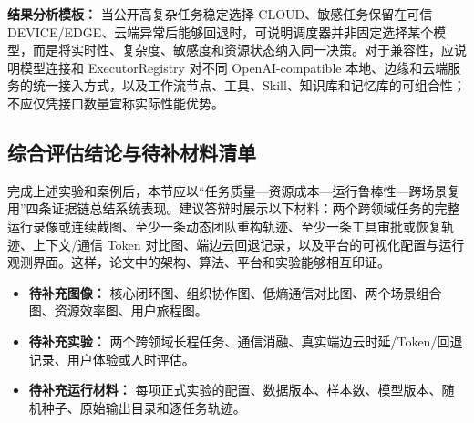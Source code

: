 \documentclass[UTF8,a4paper,12pt]{ctexart}
\begin{document}
\textbf{结果分析模板：} 当公开高复杂任务稳定选择 CLOUD、敏感任务保留在可信 DEVICE/EDGE、云端异常后能够回退时，可说明调度器并非固定选择某个模型，而是将实时性、复杂度、敏感度和资源状态纳入同一决策。对于兼容性，应说明模型连接和 ExecutorRegistry 对不同 OpenAI-compatible 本地、边缘和云端服务的统一接入方式，以及工作流节点、工具、Skill、知识库和记忆库的可组合性；不应仅凭接口数量宣称实际性能优势。

\subsection{综合评估结论与待补材料清单}

完成上述实验和案例后，本节应以“任务质量—资源成本—运行鲁棒性—跨场景复用”四条证据链总结系统表现。建议答辩时展示以下材料：两个跨领域任务的完整运行录像或连续截图、至少一条动态团队重构轨迹、至少一条工具审批或恢复轨迹、上下文/通信 Token 对比图、端边云回退记录，以及平台的可视化配置与运行观测界面。这样，论文中的架构、算法、平台和实验能够相互印证。

\begin{itemize}
\item \textbf{待补充图像：} 核心闭环图、组织协作图、低熵通信对比图、两个场景组合图、资源效率图、用户旅程图。
\item \textbf{待补充实验：} 两个跨领域长程任务、通信消融、真实端边云时延/Token/回退记录、用户体验或人时评估。
\item \textbf{待补充运行材料：} 每项正式实验的配置、数据版本、样本数、模型版本、随机种子、原始输出目录和逐任务轨迹。
\end{itemize}
\end{document}
